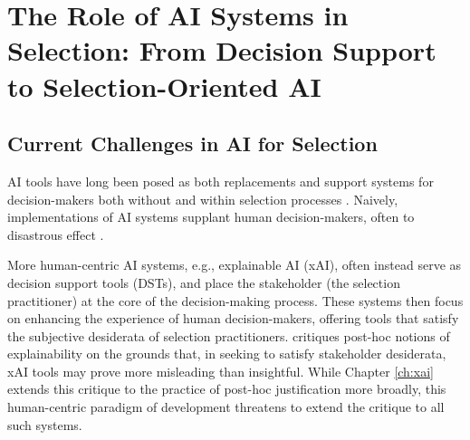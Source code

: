 




\section{The Role of AI Systems in Selection: From Decision Support to Selection-Oriented AI}
\subsection{Current Challenges in AI for Selection}
AI tools have long been posed as both replacements and support systems for decision-makers both without and within selection processes \cite{barocas_big_2016,jacobs_how_2021,hildebrandt_law_nodate,yarger2020algorithmic,mattu_how_nodate}. Naively, implementations of AI systems supplant human decision-makers, often to disastrous effect \cite{mattu_how_nodate}.

More human-centric AI systems, e.g., explainable AI (xAI), often instead serve as decision support tools (DSTs), and place the stakeholder (the selection practitioner) at the core of the decision-making process. These systems then focus on enhancing the experience of human decision-makers, offering tools that satisfy the subjective desiderata of selection practitioners. \textcite{Lipton} critiques post-hoc notions of explainability on the grounds that, in seeking to satisfy stakeholder desiderata, xAI tools may prove more misleading than insightful. While Chapter \ref{ch:xai} extends this critique to the practice of post-hoc justification more broadly, this human-centric paradigm of development threatens to extend the critique to all such systems.

